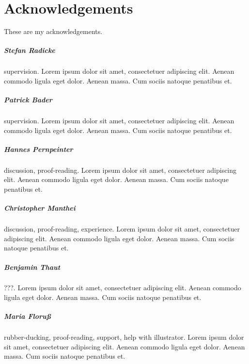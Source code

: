 
\chapter*{Acknowledgements}
\label{cha:Acknowledgements}

These are my acknowledgements.


\paragraph{Stefan Radicke}
  supervision.
  Lorem ipsum dolor sit amet, consectetuer adipiscing elit. Aenean commodo ligula eget dolor. Aenean massa. Cum sociis natoque penatibus et.

\paragraph{Patrick Bader}
  supervision.
  Lorem ipsum dolor sit amet, consectetuer adipiscing elit. Aenean commodo ligula eget dolor. Aenean massa. Cum sociis natoque penatibus et.

\paragraph{Hannes Pernpeinter}
  discussion, proof-reading.
  Lorem ipsum dolor sit amet, consectetuer adipiscing elit. Aenean commodo ligula eget dolor. Aenean massa. Cum sociis natoque penatibus et.

\paragraph{Christopher Manthei}
  discussion, proof-reading, experience.
  Lorem ipsum dolor sit amet, consectetuer adipiscing elit. Aenean commodo ligula eget dolor. Aenean massa. Cum sociis natoque penatibus et.

\paragraph{Benjamin Thaut}
  ???.
  Lorem ipsum dolor sit amet, consectetuer adipiscing elit. Aenean commodo ligula eget dolor. Aenean massa. Cum sociis natoque penatibus et.

\paragraph{Maria Floruß}
  rubber-ducking, proof-reading, support, help with illustrator.
  Lorem ipsum dolor sit amet, consectetuer adipiscing elit. Aenean commodo ligula eget dolor. Aenean massa. Cum sociis natoque penatibus et.
